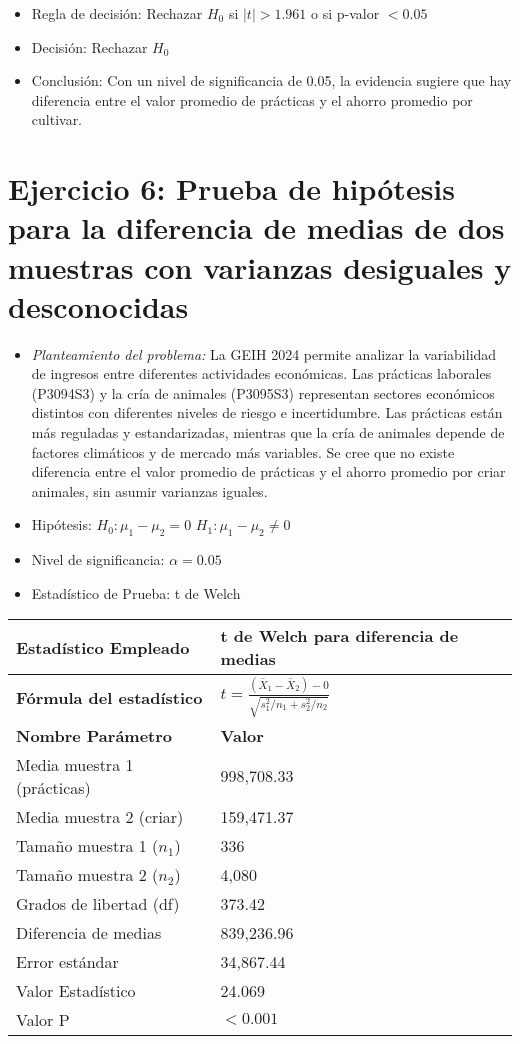 \documentclass[12pt,a4paper]{article}
\begin{document}
\begin{itemize}
    \item Regla de decisión: Rechazar $H_0$ si $|t| > 1.961$ o si p-valor $< 0.05$
    \item Decisión: Rechazar $H_0$
    \item Conclusión: Con un nivel de significancia de 0.05, la evidencia sugiere que hay diferencia entre el valor promedio de prácticas y el ahorro promedio por cultivar.
\end{itemize}

\section*{Ejercicio 6: Prueba de hipótesis para la diferencia de medias de dos muestras con varianzas desiguales y desconocidas}
\begin{itemize}
    \item \textit{Planteamiento del problema:} La GEIH 2024 permite analizar la variabilidad de ingresos entre diferentes actividades económicas. Las prácticas laborales (P3094S3) y la cría de animales (P3095S3) representan sectores económicos distintos con diferentes niveles de riesgo e incertidumbre. Las prácticas están más reguladas y estandarizadas, mientras que la cría de animales depende de factores climáticos y de mercado más variables. Se cree que no existe diferencia entre el valor promedio de prácticas y el ahorro promedio por criar animales, sin asumir varianzas iguales.
    \item Hipótesis: \quad $H_{0}: \mu_1 - \mu_2 = 0$ \hspace{2cm} $H_{1}: \mu_1 - \mu_2 \neq 0$
    \item Nivel de significancia: $\alpha = 0.05$
    \item Estadístico de Prueba: t de Welch
\end{itemize}

\begin{tabular}{|m{7cm}|m{7cm}|}
\hline
\textbf{Estadístico Empleado} & t de Welch para diferencia de medias \\ \hline
\textbf{Fórmula del estadístico} & $t = \frac{(\bar{X}_1 - \bar{X}_2) - 0}{\sqrt{s_1^2/n_1 + s_2^2/n_2}}$ \\ \hline
\textbf{Nombre Parámetro} & \textbf{Valor} \\ \hline
Media muestra 1 (prácticas) & 998,708.33 \\ \hline
Media muestra 2 (criar) & 159,471.37 \\ \hline
Tamaño muestra 1 ($n_1$) & 336 \\ \hline
Tamaño muestra 2 ($n_2$) & 4,080 \\ \hline
Grados de libertad (df) & 373.42 \\ \hline
Diferencia de medias & 839,236.96 \\ \hline
Error estándar & 34,867.44 \\ \hline
Valor Estadístico & 24.069 \\ \hline
Valor P & $< 0.001$ \\ \hline
\end{tabular}
\end{document}
